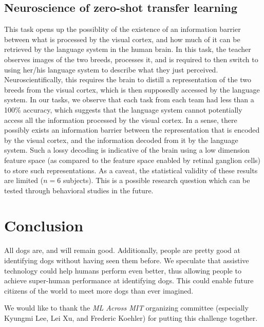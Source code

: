 \documentclass[sigplan,10pt]{acmart}
\begin{document}
\subsection{Neuroscience of zero-shot transfer learning}
This task opens up the possiblity of the existence of an information barrier between what is processed by the visual cortex, and how much of it can be retrieved by the language system in the human brain. In this task, the teacher observes images of the two breeds, processes it, and is required to then switch to using her/his language system to describe what they just perceived. Neuroscientifically, this requires the brain to distill a representation of the two breeds from the visual cortex, which is then supposedly accessed by the language system. In our tasks, we observe that each task from each team had less than a 100\% accuracy, which suggests that the language system cannot potentially access all the information processed by the visual cortex. In a sense, there possibly exists an information barrier between the representation that is encoded by the visual cortex, and the information decoded from it by the language system. Such a lossy decoding is indicative of the brain using a low dimension feature space (as compared to the feature space enabled by retinal ganglion cells) to store such representations. As a caveat, the statistical validity of these results are limited ($n=6$ subjects). This is a possible research question which can be tested through behavioral studies in the future.

\section{Conclusion}

All dogs are, and will remain good. Additionally, people are pretty good at identifying dogs without having seen them before. We speculate that assistive technology could help humans perform even better, thus allowing people to achieve super-human performance at identifying dogs. This could enable future citizens of the world to meet more dogs than ever imagined.



\begin{acks}
We would like to thank the \textit{ML Across MIT} organizing committee (especially Kyungmi Lee, Lei Xu, and Frederic Koehler) for putting this challenge together.

\end{acks}
\end{document}
